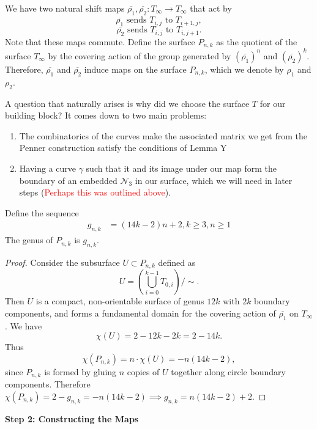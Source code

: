 We have two natural shift maps $\overline{\rho_1},\overline{\rho_2}: T_\infty \xrightarrow[]{} T_\infty$ that act by $$\overline{\rho_1} \text{ sends } T_{i,j} \text{ to } T_{i+1,j},$$ $$\overline{\rho_2} \text{ sends } T_{i,j} \text{ to } T_{i,j+1}.$$ Note that these maps commute. Define the surface $P_{n,k}$ as the quotient of the surface $T_\infty$ by the covering action of the group generated by $(\overline{\rho_1})^n$ and $(\overline{\rho_2})^k$. Therefore, $\overline{\rho_1}$ and $\overline{\rho_2}$ induce maps on the surface $P_{n,k}$, which we denote by $\rho_1$ and $\rho_2$.

A question that naturally arises is why did we choose the surface $T$ for our building block? It comes down to two main problems:
\begin{enumerate}
    \item The combinatorics of the curves make the associated matrix we get from the Penner construction satisfy the conditions of Lemma Y
    \item Having a curve $\gamma$ such that it and its image under our map form the boundary of an embedded $\mathcal{N}_3$ in our surface, which we will need in later steps (\textcolor{red}{Perhaps this was outlined above}).
\end{enumerate}

\begin{lem}
Define the sequence
\begin{align}
    g_{n,k} &= (14k - 2)n + 2, k \geq 3, n \geq 1
\end{align}
    The genus of $P_{n,k}$ is $g_{n,k}$.
\end{lem}
\begin{proof}
    Consider the subsurface $U \subset P_{n,k}$ defined as $$U = \left( \bigcup_{i =0}^{k-1} T_{0,i} \right)/\sim.$$ Then $U$ is a compact, non-orientable surface of genus $12k$ with $2k$ boundary components, and forms a fundamental domain for the covering action of $\overline{\rho_1}$ on $T_\infty$. We have $$\chi(U) = 2 - 12k - 2k = 2 - 14k.$$ Thus $$\chi(P_{n,k}) = n \cdot \chi(U) = -n(14k - 2),$$ since $P_{n,k}$ is formed by gluing $n$ copies of $U$ together along circle boundary components. Therefore $\chi(P_{n,k}) = 2 - g_{n,k} = -n(14k - 2) \implies g_{n,k} = n(14k - 2) + 2$.
\end{proof}

\begin{center}
\textbf{Step 2: Constructing the Maps}
\end{center}



